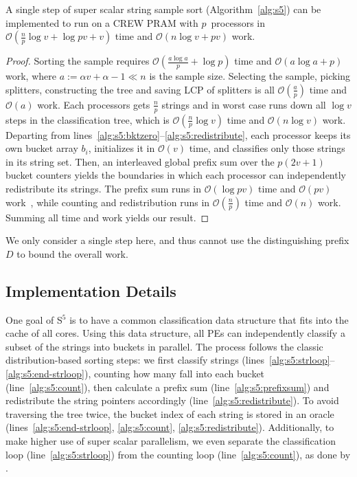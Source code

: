 \documentclass[a4paper]{myjournal}
\newcommand{\Oh}[1]{\mathcal{O}\!\left( #1\right)}
\def\Oh#1{\mathcal{O}(#1)}
\begin{document}
\begin{theorem}
  A single step of super scalar string sample sort (Algorithm~\ref{alg:s5}) can
  be implemented to run on a CREW PRAM with $p$~processors in $\Oh{\frac{n}{p}
    \log v + \log pv + v}$ time and $\Oh{n \log v + pv}$ work.
\end{theorem}
\begin{proof}
  Sorting the sample requires $\Oh{\frac{a \log a}{p} + \log p}$ time and
  $\Oh{a \log a + p}$ work, where $a := \alpha v + \alpha - 1 \ll n$ is the
  sample size. Selecting the sample, picking splitters, constructing the tree
  and saving LCP of splitters is all $\Oh{\frac{a}{p}}$ time and $\Oh{a}$
  work. Each processors gets $\frac{n}{p}$ strings and in worst case runs down
  all $\log v$ steps in the classification tree, which is $\Oh{\frac{n}{p} \log
    v}$ time and $\Oh{n \log v}$ work. Departing from
  lines~\ref{alg:s5:bktzero}--\ref{alg:s5:redistribute}, each processor keeps
  its own bucket array $b_i$, initializes it in $\Oh{v}$ time, and classifies
  only those strings in its string set. Then, an interleaved global prefix sum
  over the $p(2v+1)$ bucket counters yields the boundaries in which each
  processor can independently redistribute its strings. The prefix sum runs in
  $\Oh{\log pv}$ time and $\Oh{pv}$ work~\cite{kogge1973parallel}, while
  counting and redistribution runs in $\Oh{\frac{n}{p}}$ time and $\Oh{n}$
  work. Summing all time and work yields our result.
\end{proof}

We only consider a single step here, and thus cannot use the distinguishing
prefix $D$ to bound the overall work.

\subsection{Implementation Details}

One goal of S$^5$ is to have a common classification data structure that fits
into the cache of all cores. Using this data structure, all PEs can
independently classify a subset of the strings into buckets in parallel.  The
process follows the classic distribution-based sorting steps: we first classify
strings (lines~\ref{alg:s5:strloop}--\ref{alg:s5:end-strloop}), counting how
many fall into each bucket (line~\ref{alg:s5:count}), then calculate a prefix
sum (line~\ref{alg:s5:prefixsum}) and redistribute the string pointers
accordingly (line~\ref{alg:s5:redistribute}). To avoid traversing the tree
twice, the bucket index of each string is stored in an oracle
(lines~\ref{alg:s5:end-strloop}, \ref{alg:s5:count},
\ref{alg:s5:redistribute}). Additionally, to make higher use of super scalar
parallelism, we even separate the classification loop
(line~\ref{alg:s5:strloop}) from the counting loop (line~\ref{alg:s5:count}), as
done by \cite{karkkainen2009engineering}.
\end{document}
